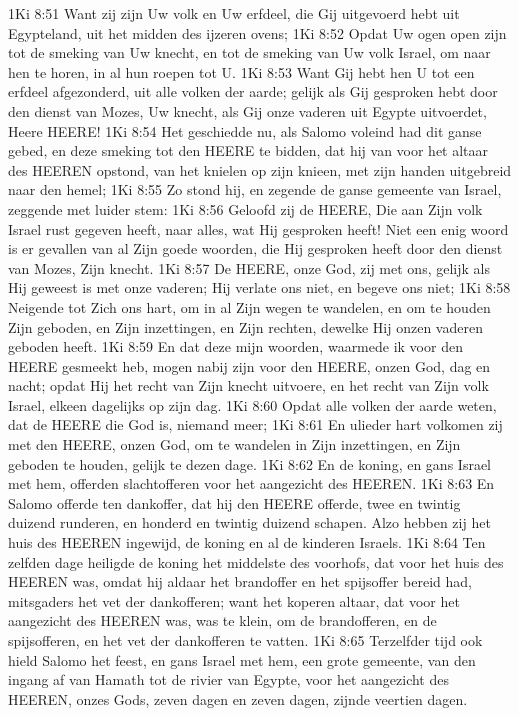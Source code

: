 1Ki 8:51  Want zij zijn Uw volk en Uw erfdeel, die Gij uitgevoerd hebt uit Egypteland, uit het midden des ijzeren ovens;
1Ki 8:52  Opdat Uw ogen open zijn tot de smeking van Uw knecht, en tot de smeking van Uw volk Israel, om naar hen te horen, in al hun roepen tot U.
1Ki 8:53  Want Gij hebt hen U tot een erfdeel afgezonderd, uit alle volken der aarde; gelijk als Gij gesproken hebt door den dienst van Mozes, Uw knecht, als Gij onze vaderen uit Egypte uitvoerdet, Heere HEERE!
1Ki 8:54  Het geschiedde nu, als Salomo voleind had dit ganse gebed, en deze smeking tot den HEERE te bidden, dat hij van voor het altaar des HEEREN opstond, van het knielen op zijn knieen, met zijn handen uitgebreid naar den hemel;
1Ki 8:55  Zo stond hij, en zegende de ganse gemeente van Israel, zeggende met luider stem:
1Ki 8:56  Geloofd zij de HEERE, Die aan Zijn volk Israel rust gegeven heeft, naar alles, wat Hij gesproken heeft! Niet een enig woord is er gevallen van al Zijn goede woorden, die Hij gesproken heeft door den dienst van Mozes, Zijn knecht.
1Ki 8:57  De HEERE, onze God, zij met ons, gelijk als Hij geweest is met onze vaderen; Hij verlate ons niet, en begeve ons niet;
1Ki 8:58  Neigende tot Zich ons hart, om in al Zijn wegen te wandelen, en om te houden Zijn geboden, en Zijn inzettingen, en Zijn rechten, dewelke Hij onzen vaderen geboden heeft.
1Ki 8:59  En dat deze mijn woorden, waarmede ik voor den HEERE gesmeekt heb, mogen nabij zijn voor den HEERE, onzen God, dag en nacht; opdat Hij het recht van Zijn knecht uitvoere, en het recht van Zijn volk Israel, elkeen dagelijks op zijn dag.
1Ki 8:60  Opdat alle volken der aarde weten, dat de HEERE die God is, niemand meer;
1Ki 8:61  En ulieder hart volkomen zij met den HEERE, onzen God, om te wandelen in Zijn inzettingen, en Zijn geboden te houden, gelijk te dezen dage.
1Ki 8:62  En de koning, en gans Israel met hem, offerden slachtofferen voor het aangezicht des HEEREN.
1Ki 8:63  En Salomo offerde ten dankoffer, dat hij den HEERE offerde, twee en twintig duizend runderen, en honderd en twintig duizend schapen. Alzo hebben zij het huis des HEEREN ingewijd, de koning en al de kinderen Israels.
1Ki 8:64  Ten zelfden dage heiligde de koning het middelste des voorhofs, dat voor het huis des HEEREN was, omdat hij aldaar het brandoffer en het spijsoffer bereid had, mitsgaders het vet der dankofferen; want het koperen altaar, dat voor het aangezicht des HEEREN was, was te klein, om de brandofferen, en de spijsofferen, en het vet der dankofferen te vatten.
1Ki 8:65  Terzelfder tijd ook hield Salomo het feest, en gans Israel met hem, een grote gemeente, van den ingang af van Hamath tot de rivier van Egypte, voor het aangezicht des HEEREN, onzes Gods, zeven dagen en zeven dagen, zijnde veertien dagen.
